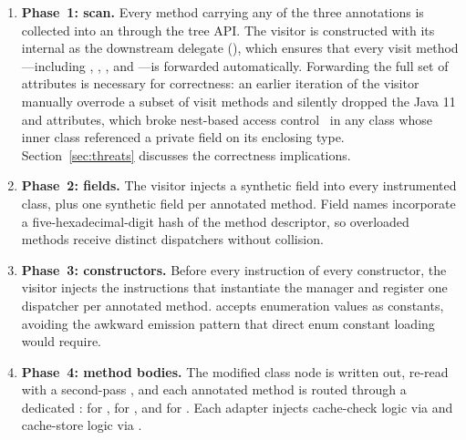 \begin{enumerate}[leftmargin=*,nosep]
    \item \textbf{Phase~1: scan.} Every method carrying any of the three annotations is collected into an \asm {} through the tree API. The visitor is constructed with its internal  as the downstream delegate (), which ensures that every visit method---including , , , and ---is forwarded automatically. Forwarding the full set of attributes is necessary for correctness: an earlier iteration of the visitor manually overrode a subset of visit methods and silently dropped the Java 11  and  attributes, which broke nest-based access control~\cite{jep181} in any class whose inner class referenced a private field on its enclosing type. Section~\ref{sec:threats} discusses the correctness implications.
    \item \textbf{Phase~2: fields.} The visitor injects a synthetic  field into every instrumented class, plus one synthetic  field per annotated method. Field names incorporate a five-hexadecimal-digit hash of the method descriptor, so overloaded methods receive distinct dispatchers without collision.
    \item \textbf{Phase~3: constructors.} Before every  instruction of every constructor, the visitor injects the instructions that instantiate the manager and register one dispatcher per annotated method.  accepts enumeration values as  constants, avoiding the awkward  emission pattern that direct enum constant loading would require.
    \item \textbf{Phase~4: method bodies.} The modified class node is written out, re-read with a second-pass , and each annotated method is routed through a dedicated :  for ,  for , and  for . Each adapter injects cache-check logic via  and cache-store logic via .
\end{enumerate}

